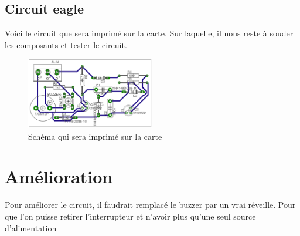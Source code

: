 \section{Circuit eagle}

Voici le circuit que sera imprimé sur la carte. Sur laquelle, il nous reste à souder les composants et tester le circuit.

\begin{figure}[H]
\centering
\includegraphics[width=0.5\textwidth]{ressources/schemaBoard}
\caption{Schéma qui sera imprimé sur la carte}
\label{schemaBoard}
\end{figure}




\chapter{Amélioration}

Pour améliorer le circuit, il faudrait remplacé le buzzer par un vrai réveille. Pour que l'on puisse retirer l'interrupteur et n'avoir plus qu'une seul source d'alimentation





